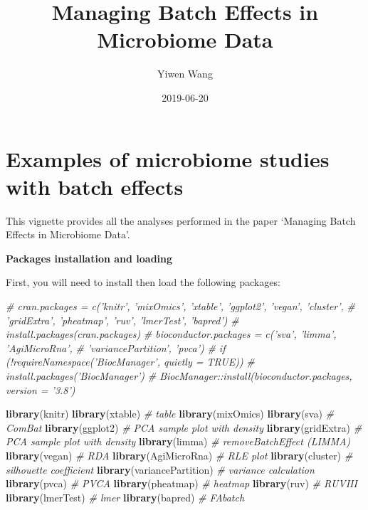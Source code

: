 \documentclass[]{book}
\title{Managing Batch Effects in Microbiome Data}
\author{Yiwen Wang}
\date{2019-06-20}
\newenvironment{Shaded}{\begin{snugshade}}{\end{snugshade}}
\newcommand{\KeywordTok}[1]{\textcolor[rgb]{0.13,0.29,0.53}{\textbf{#1}}}
\newcommand{\CommentTok}[1]{\textcolor[rgb]{0.56,0.35,0.01}{\textit{#1}}}
\newcommand{\NormalTok}[1]{#1}
\begin{document}
\maketitle

{
\setcounter{tocdepth}{3}
\tableofcontents
}
\chapter{Examples of microbiome studies with batch
effects}\label{examples-of-microbiome-studies-with-batch-effects}

This vignette provides all the analyses performed in the paper `Managing
Batch Effects in Microbiome Data'.

\textbf{Packages installation and loading}

First, you will need to install then load the following packages:

\begin{Shaded}
\begin{Highlighting}[]
\CommentTok{# cran.packages = c('knitr', 'mixOmics', 'xtable', 'ggplot2', 'vegan', 'cluster',}
\CommentTok{#                   'gridExtra', 'pheatmap', 'ruv', 'lmerTest', 'bapred')}
\CommentTok{# install.packages(cran.packages)}
\CommentTok{# bioconductor.packages = c('sva', 'limma', 'AgiMicroRna', }
\CommentTok{#                           'variancePartition', 'pvca')}
\CommentTok{# if (!requireNamespace('BiocManager', quietly = TRUE))}
\CommentTok{#     install.packages('BiocManager')}
\CommentTok{# BiocManager::install(bioconductor.packages, version = '3.8')}

\KeywordTok{library}\NormalTok{(knitr)}
\KeywordTok{library}\NormalTok{(xtable) }\CommentTok{# table}
\KeywordTok{library}\NormalTok{(mixOmics)}
\KeywordTok{library}\NormalTok{(sva) }\CommentTok{# ComBat}
\KeywordTok{library}\NormalTok{(ggplot2) }\CommentTok{# PCA sample plot with density}
\KeywordTok{library}\NormalTok{(gridExtra) }\CommentTok{# PCA sample plot with density}
\KeywordTok{library}\NormalTok{(limma) }\CommentTok{# removeBatchEffect (LIMMA)}
\KeywordTok{library}\NormalTok{(vegan) }\CommentTok{# RDA}
\KeywordTok{library}\NormalTok{(AgiMicroRna) }\CommentTok{# RLE plot}
\KeywordTok{library}\NormalTok{(cluster) }\CommentTok{# silhouette coefficient}
\KeywordTok{library}\NormalTok{(variancePartition) }\CommentTok{# variance calculation}
\KeywordTok{library}\NormalTok{(pvca) }\CommentTok{# PVCA}
\KeywordTok{library}\NormalTok{(pheatmap) }\CommentTok{# heatmap}
\KeywordTok{library}\NormalTok{(ruv) }\CommentTok{# RUVIII}
\KeywordTok{library}\NormalTok{(lmerTest) }\CommentTok{# lmer}
\KeywordTok{library}\NormalTok{(bapred) }\CommentTok{# FAbatch}
\end{Highlighting}
\end{Shaded}
\end{document}
